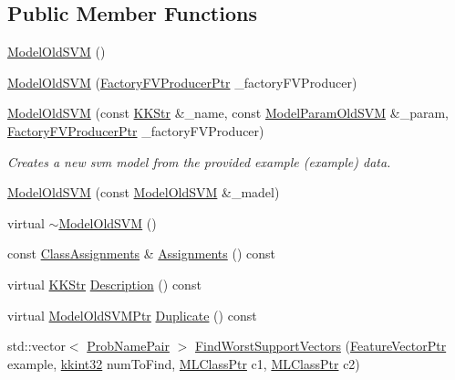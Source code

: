 \subsection*{Public Member Functions}
\begin{DoxyCompactItemize}
\item 
\hyperlink{class_k_k_m_l_l_1_1_model_old_s_v_m_af3b82973372d969133346addaedcc6ae}{Model\+Old\+S\+VM} ()
\item 
\hyperlink{class_k_k_m_l_l_1_1_model_old_s_v_m_a74ca238c232d3ef90f7abb9ad374d25f}{Model\+Old\+S\+VM} (\hyperlink{namespace_k_k_m_l_l_a82812d1feb85a6cff72d059bc67bb90e}{Factory\+F\+V\+Producer\+Ptr} \+\_\+factory\+F\+V\+Producer)
\item 
\hyperlink{class_k_k_m_l_l_1_1_model_old_s_v_m_acd33cfc7840b7b3744fe5fef9c607b20}{Model\+Old\+S\+VM} (const \hyperlink{class_k_k_b_1_1_k_k_str}{K\+K\+Str} \&\+\_\+name, const \hyperlink{class_k_k_m_l_l_1_1_model_param_old_s_v_m}{Model\+Param\+Old\+S\+VM} \&\+\_\+param, \hyperlink{namespace_k_k_m_l_l_a82812d1feb85a6cff72d059bc67bb90e}{Factory\+F\+V\+Producer\+Ptr} \+\_\+factory\+F\+V\+Producer)
\begin{DoxyCompactList}\small\item\em Creates a new svm model from the provided example (example) data. \end{DoxyCompactList}\item 
\hyperlink{class_k_k_m_l_l_1_1_model_old_s_v_m_a3fce12e387b31d4a875d74fa5e850556}{Model\+Old\+S\+VM} (const \hyperlink{class_k_k_m_l_l_1_1_model_old_s_v_m}{Model\+Old\+S\+VM} \&\+\_\+madel)
\item 
virtual \hyperlink{class_k_k_m_l_l_1_1_model_old_s_v_m_a63b1861e59f72cd6720bf3a2809d6cc4}{$\sim$\+Model\+Old\+S\+VM} ()
\item 
const \hyperlink{class_k_k_m_l_l_1_1_class_assignments}{Class\+Assignments} \& \hyperlink{class_k_k_m_l_l_1_1_model_old_s_v_m_ab525570e2351ac98346d6588ccc7e07a}{Assignments} () const 
\item 
virtual \hyperlink{class_k_k_b_1_1_k_k_str}{K\+K\+Str} \hyperlink{class_k_k_m_l_l_1_1_model_old_s_v_m_acf772fa891ad68f3dce3b8154735051d}{Description} () const 
\item 
virtual \hyperlink{class_k_k_m_l_l_1_1_model_old_s_v_m_a0ad9d6a95b826532145fd3778a396db4}{Model\+Old\+S\+V\+M\+Ptr} \hyperlink{class_k_k_m_l_l_1_1_model_old_s_v_m_a1dffdfc8482b7835099937d0ca2ff08a}{Duplicate} () const 
\item 
std\+::vector$<$ \hyperlink{class_k_k_m_l_l_1_1_prob_name_pair}{Prob\+Name\+Pair} $>$ \hyperlink{class_k_k_m_l_l_1_1_model_old_s_v_m_aa9fae6fe0515c619de4169ba674ebb99}{Find\+Worst\+Support\+Vectors} (\hyperlink{namespace_k_k_m_l_l_a0c5df3d48f45926fbc4fee04f5e3bc04}{Feature\+Vector\+Ptr} example, \hyperlink{namespace_k_k_b_a8fa4952cc84fda1de4bec1fbdd8d5b1b}{kkint32} num\+To\+Find, \hyperlink{namespace_k_k_m_l_l_ac272393853d59e72e8456f14cd6d8c23}{M\+L\+Class\+Ptr} c1, \hyperlink{namespace_k_k_m_l_l_ac272393853d59e72e8456f14cd6d8c23}{M\+L\+Class\+Ptr} c2)

\end{DoxyCompactItemize}
